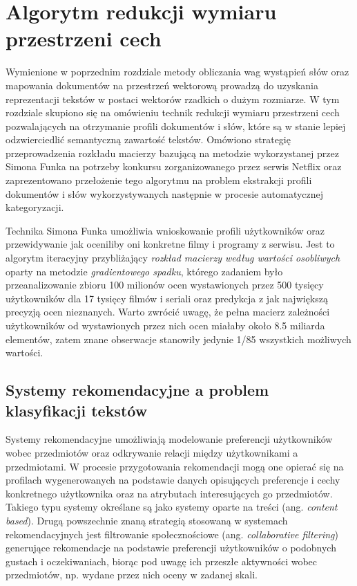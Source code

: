 \documentclass{pracamgr}
\begin{document}
\chapter{Algorytm redukcji wymiaru przestrzeni cech}

Wymienione w poprzednim rozdziale metody obliczania wag wystąpień słów oraz mapowania dokumentów na przestrzeń wektorową prowadzą do uzyskania reprezentacji tekstów w postaci wektorów rzadkich o dużym rozmiarze. W tym rozdziale skupiono się na omówieniu technik redukcji wymiaru przestrzeni cech pozwalających na otrzymanie profili dokumentów i słów, które są w stanie lepiej odzwierciedlić semantyczną zawartość tekstów. Omówiono strategię przeprowadzenia rozkładu macierzy bazującą na metodzie wykorzystanej przez Simona Funka na potrzeby konkursu zorganizowanego przez serwis Netflix oraz zaprezentowano przełożenie tego algorytmu na problem ekstrakcji profili dokumentów i słów wykorzystywanych następnie w procesie automatycznej kategoryzacji. 

Technika Simona Funka umożliwia wnioskowanie profili użytkowników oraz przewidywanie jak oceniliby oni konkretne filmy i programy z serwisu. Jest to algorytm iteracyjny przybliżający \textit{rozkład macierzy według wartości osobliwych} oparty na metodzie \textit{gradientowego spadku}, którego zadaniem było przeanalizowanie zbioru 100 milionów ocen wystawionych przez 500 tysięcy użytkowników dla 17 tysięcy filmów i seriali oraz predykcja z jak największą precyzją ocen nieznanych. Warto zwrócić uwagę, że pełna macierz zależności użytkowników od wystawionych przez nich ocen miałaby około 8.5 miliarda elementów, zatem znane obserwacje stanowiły jedynie 1/85 wszystkich możliwych wartości.

\section{Systemy rekomendacyjne a problem klasyfikacji tekstów}

Systemy rekomendacyjne umożliwiają modelowanie preferencji użytkowników wobec przedmiotów oraz odkrywanie relacji między użytkownikami a przedmiotami. W procesie przygotowania rekomendacji mogą one opierać się na profilach wygenerowanych na podstawie danych opisujących preferencje i cechy konkretnego użytkownika oraz na atrybutach interesujących go przedmiotów. Takiego typu systemy określane są jako systemy oparte na treści (ang. \textit{content based}). Drugą powszechnie znaną strategią stosowaną w systemach rekomendacyjnych jest filtrowanie społecznościowe (ang. \textit{collaborative filtering}) generujące rekomendacje na podstawie preferencji użytkowników o podobnych gustach i oczekiwaniach, biorąc pod uwagę ich przeszłe aktywności wobec przedmiotów, np. wydane przez nich oceny w zadanej skali.
\end{document}
